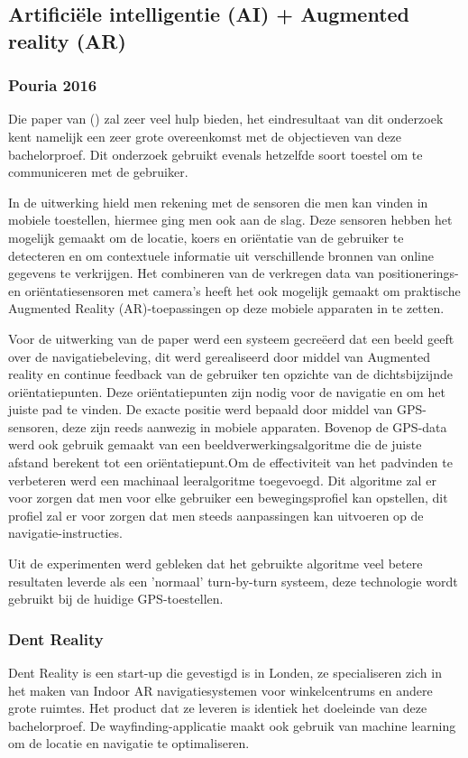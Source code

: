 \subsection{Artificiële intelligentie (AI) + Augmented reality (AR)}
\subsubsection{Pouria 2016}
Die paper van \textcite{Pouria2016} () zal zeer veel hulp bieden, het eindresultaat van dit onderzoek kent namelijk een zeer grote overeenkomst met de objectieven van deze bachelorproef. Dit onderzoek gebruikt evenals hetzelfde soort toestel om te communiceren met de gebruiker.

In de uitwerking hield men rekening met de sensoren die men kan vinden in mobiele toestellen, hiermee ging men ook aan de slag. Deze sensoren hebben het mogelijk gemaakt om de locatie, koers en oriëntatie van de gebruiker te detecteren en om contextuele informatie uit verschillende bronnen van online gegevens te verkrijgen. Het combineren van de verkregen data van positionerings- en oriëntatiesensoren met camera's heeft het ook mogelijk gemaakt om praktische Augmented Reality (AR)-toepassingen op deze mobiele apparaten in te zetten. 

Voor de uitwerking van de paper werd een systeem gecreëerd dat een beeld geeft over de navigatiebeleving, dit werd gerealiseerd door middel van Augmented reality en continue feedback van de gebruiker ten opzichte van de dichtsbijzijnde oriëntatiepunten. Deze oriëntatiepunten zijn nodig voor de navigatie en om het juiste pad te vinden. De exacte positie werd bepaald door middel van GPS-sensoren, deze zijn reeds aanwezig in mobiele apparaten. Bovenop de GPS-data werd ook gebruik gemaakt van een beeldverwerkingsalgoritme die de juiste afstand berekent tot een oriëntatiepunt.Om de effectiviteit van het padvinden te verbeteren werd een machinaal leeralgoritme toegevoegd. Dit algoritme zal er voor zorgen dat men voor elke gebruiker een bewegingsprofiel kan opstellen, dit profiel zal er voor zorgen dat men steeds aanpassingen kan uitvoeren op de navigatie-instructies.

Uit de experimenten werd gebleken dat het gebruikte algoritme veel betere resultaten leverde als een 'normaal' turn-by-turn systeem, deze technologie wordt gebruikt bij de huidige GPS-toestellen.

\subsubsection{Dent Reality}
Dent Reality is een start-up die gevestigd is in Londen, ze specialiseren zich in het maken van Indoor AR navigatiesystemen voor winkelcentrums en andere grote ruimtes. Het product dat ze leveren is identiek het doeleinde van deze bachelorproef. De wayfinding-applicatie maakt ook gebruik van machine learning om de locatie en navigatie te optimaliseren.

